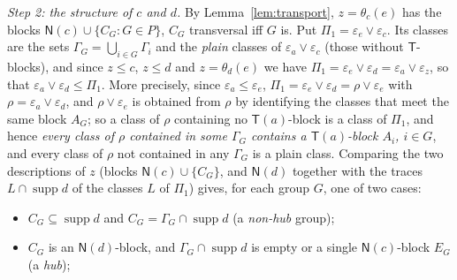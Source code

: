 \documentclass[11pt]{amsart}
\theoremstyle{definition}
\newcommand{\supp}{\operatorname{supp}}
\newcommand{\T}{\mathsf{T}}
\newcommand{\N}{\mathsf{N}}
\begin{document}
\smallskip
\emph{Step 2: the structure of $c$ and $d$.} By Lemma~\ref{lem:transport}, $z=\theta_c(e)$ has the blocks $\N(c)\cup\{C_G:G\in P\}$, $C_G$ transversal iff $G$ is. Put $\Pi_1=\varepsilon_e\vee\varepsilon_c$. Its classes are the sets $\Gamma_G=\bigcup_{i\in G}\Gamma_i$ and the \emph{plain} classes of $\varepsilon_a\vee\varepsilon_c$ (those without $\T$-blocks), and since $z\le c$, $z\le d$ and $z=\theta_d(e)$ we have $\Pi_1=\varepsilon_e\vee\varepsilon_d=\varepsilon_a\vee\varepsilon_z$, so that $\varepsilon_a\vee\varepsilon_d\le\Pi_1$. More precisely, since $\varepsilon_a\le\varepsilon_e$, $\Pi_1=\varepsilon_e\vee\varepsilon_d=\rho\vee\varepsilon_e$ with $\rho=\varepsilon_a\vee\varepsilon_d$, and $\rho\vee\varepsilon_e$ is obtained from $\rho$ by identifying the classes that meet the same block $A_G$; so a class of $\rho$ containing no $\T(a)$-block is a class of $\Pi_1$, and hence \emph{every class of $\rho$ contained in some $\Gamma_G$ contains a $\T(a)$-block $A_i$, $i\in G$}, and every class of $\rho$ not contained in any $\Gamma_G$ is a plain class. Comparing the two descriptions of $z$ (blocks $\N(c)\cup\{C_G\}$, and $\N(d)$ together with the traces $L\cap\supp d$ of the classes $L$ of $\Pi_1$) gives, for each group $G$, one of two cases:
\begin{itemize}[nosep]
\item[(nh)] $C_G\subseteq\supp d$ and $C_G=\Gamma_G\cap\supp d$ (a \emph{non-hub} group);
\item[(h)] $C_G$ is an $\N(d)$-block, and $\Gamma_G\cap\supp d$ is empty or a single $\N(c)$-block $E_G$ (a \emph{hub});
\end{itemize}
\end{document}
